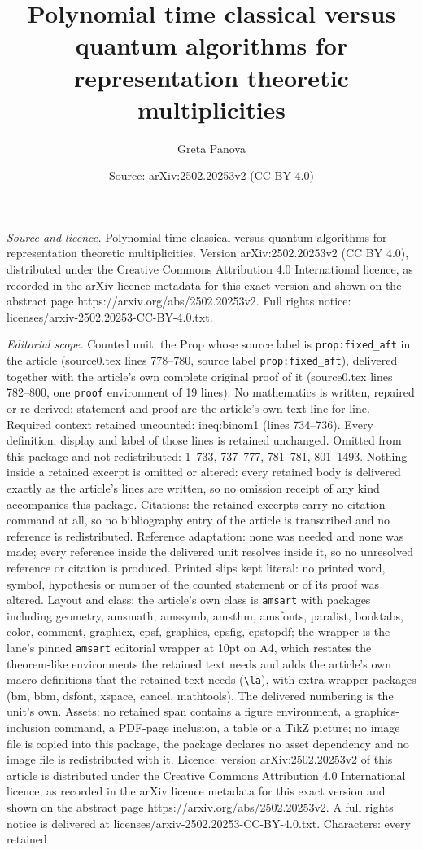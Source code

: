 \documentclass[10pt,a4paper]{amsart}
\title[Polynomial time classical versus quantum algorithms for repr]{Polynomial time classical versus quantum algorithms for representation theoretic multiplicities}
\author{Greta Panova}
\date{Source: arXiv:2502.20253v2 (CC BY 4.0)}
\begin{document}
\maketitle

\noindent\emph{Source and licence.} Polynomial time classical versus quantum algorithms for representation theoretic multiplicities. Version arXiv:2502.20253v2 (CC BY 4.0), distributed under the Creative Commons Attribution 4.0 International licence, as recorded in the arXiv licence metadata for this exact version and shown on the abstract page https://arxiv.org/abs/2502.20253v2. Full rights notice: licenses/arxiv-2502.20253-CC-BY-4.0.txt.\par\smallskip

\noindent\textit{Editorial scope.} Counted unit: the Prop whose source label is \texttt{prop:fixed\_aft} in the article (source0.tex lines 778--780, source label \texttt{prop:fixed\_aft}), delivered together with the article's own complete original proof of it (source0.tex lines 782--800, one \texttt{proof} environment of 19 lines). No mathematics is written, repaired or re-derived: statement and proof are the article's own text line for line. Required context retained uncounted: ineq:binom1 (lines 734--736). Every definition, display and label of those lines is retained unchanged. Omitted from this package and not redistributed: 1--733, 737--777, 781--781, 801--1493. Nothing inside a retained excerpt is omitted or altered: every retained body is delivered exactly as the article's lines are written, so no omission receipt of any kind accompanies this package. Citations: the retained excerpts carry no citation command at all, so no bibliography entry of the article is transcribed and no reference is redistributed. Reference adaptation: none was needed and none was made; every reference inside the delivered unit resolves inside it, so no unresolved reference or citation is produced. Printed slips kept literal: no printed word, symbol, hypothesis or number of the counted statement or of its proof was altered. Layout and class: the article's own class is \texttt{amsart} with packages including geometry, amsmath, amssymb, amsthm, amsfonts, paralist, booktabs, color, comment, graphicx, epsf, graphics, epsfig, epstopdf; the wrapper is the lane's pinned \texttt{amsart} editorial wrapper at 10pt on A4, which restates the theorem-like environments the retained text needs and adds the article's own macro definitions that the retained text needs (\texttt{\textbackslash la}), with extra wrapper packages (bm, bbm, dsfont, xspace, cancel, mathtools). The delivered numbering is the unit's own. Assets: no retained span contains a figure environment, a graphics-inclusion command, a PDF-page inclusion, a table or a TikZ picture; no image file is copied into this package, the package declares no asset dependency and no image file is redistributed with it. Licence: version arXiv:2502.20253v2 of this article is distributed under the Creative Commons Attribution 4.0 International licence, as recorded in the arXiv licence metadata for this exact version and shown on the abstract page https://arxiv.org/abs/2502.20253v2. A full rights notice is delivered at licenses/arxiv-2502.20253-CC-BY-4.0.txt. Characters: every retained 
\end{document}
